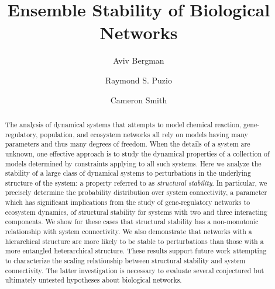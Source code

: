 \documentclass{amsart}
\theoremstyle{definition}
\theoremstyle{remark}
\numberwithin{equation}{section}
\begin{document}
\let\ref\autoref

\title{Ensemble Stability of Biological Networks}

\author{Aviv Bergman}
\address{Department of Systems and Computational Biology, Albert Einstein College of Medicine, Bronx, New York 10461}
\curraddr{}

\author{Raymond S. Puzio}
\address{Department of Systems and Computational Biology, Albert Einstein College of Medicine, Bronx, New York 10461}
\curraddr{}

\author{Cameron Smith}
\address{Department of Systems and Computational Biology, Albert Einstein College of Medicine, Bronx, New York 10461}
\curraddr{}





\begin{abstract}
The analysis of dynamical systems that attempts to model chemical reaction, gene-regulatory, population, and ecosystem networks all rely on models having many parameters and thus many degrees of freedom. When the details of a system are unknown, one effective approach is to study the dynamical properties of a collection of models determined by constraints applying to all such systems. Here we analyze the stability of a large class of dynamical systems to perturbations in the underlying structure of the system: a property referred to as \emph{structural stability}. In particular, we precisely determine the probability distribution over system connectivity, a parameter which has significant implications from the study of gene-regulatory networks to ecosystem dynamics, of structural stability for systems with two and three interacting components. We show for these cases that structural stability has a non-monotonic relationship with system connectivity. We also demonstrate that networks with a hierarchical structure are more likely to be stable to perturbations than those with a more entangled heterarchical structure. These results support future work attempting to characterize the scaling relationship between structural stability and system connectivity. The latter investigation is necessary to evaluate several conjectured but ultimately untested hypotheses about biological networks.
\end{abstract}
\end{document}
